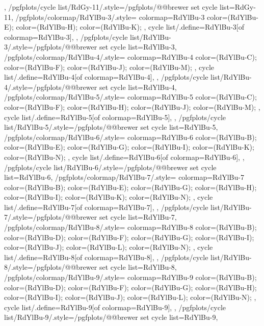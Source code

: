 {{  },
  /pgfplots/cycle list/RdGy-11/.style={/pgfplots/@@brewer set cycle list={RdGy-11}},
  /pgfplots/colormap/RdYlBu-3/.style={
    colormap={RdYlBu-3}{
      color=(RdYlBu-E);
      color=(RdYlBu-H);
      color=(RdYlBu-K);
    },
    cycle list/.define={RdYlBu-3}{[of colormap=RdYlBu-3]},
  },
  /pgfplots/cycle list/RdYlBu-3/.style={/pgfplots/@@brewer set cycle list={RdYlBu-3}},
  /pgfplots/colormap/RdYlBu-4/.style={
    colormap={RdYlBu-4}{
      color=(RdYlBu-C);
      color=(RdYlBu-F);
      color=(RdYlBu-J);
      color=(RdYlBu-M);
    },
    cycle list/.define={RdYlBu-4}{[of colormap=RdYlBu-4]},
  },
  /pgfplots/cycle list/RdYlBu-4/.style={/pgfplots/@@brewer set cycle list={RdYlBu-4}},
  /pgfplots/colormap/RdYlBu-5/.style={
    colormap={RdYlBu-5}{
      color=(RdYlBu-C);
      color=(RdYlBu-F);
      color=(RdYlBu-H);
      color=(RdYlBu-J);
      color=(RdYlBu-M);
    },
    cycle list/.define={RdYlBu-5}{[of colormap=RdYlBu-5]},
  },
  /pgfplots/cycle list/RdYlBu-5/.style={/pgfplots/@@brewer set cycle list={RdYlBu-5}},
  /pgfplots/colormap/RdYlBu-6/.style={
    colormap={RdYlBu-6}{
      color=(RdYlBu-B);
      color=(RdYlBu-E);
      color=(RdYlBu-G);
      color=(RdYlBu-I);
      color=(RdYlBu-K);
      color=(RdYlBu-N);
    },
    cycle list/.define={RdYlBu-6}{[of colormap=RdYlBu-6]},
  },
  /pgfplots/cycle list/RdYlBu-6/.style={/pgfplots/@@brewer set cycle list={RdYlBu-6}},
  /pgfplots/colormap/RdYlBu-7/.style={
    colormap={RdYlBu-7}{
      color=(RdYlBu-B);
      color=(RdYlBu-E);
      color=(RdYlBu-G);
      color=(RdYlBu-H);
      color=(RdYlBu-I);
      color=(RdYlBu-K);
      color=(RdYlBu-N);
    },
    cycle list/.define={RdYlBu-7}{[of colormap=RdYlBu-7]},
  },
  /pgfplots/cycle list/RdYlBu-7/.style={/pgfplots/@@brewer set cycle list={RdYlBu-7}},
  /pgfplots/colormap/RdYlBu-8/.style={
    colormap={RdYlBu-8}{
      color=(RdYlBu-B);
      color=(RdYlBu-D);
      color=(RdYlBu-F);
      color=(RdYlBu-G);
      color=(RdYlBu-I);
      color=(RdYlBu-J);
      color=(RdYlBu-L);
      color=(RdYlBu-N);
    },
    cycle list/.define={RdYlBu-8}{[of colormap=RdYlBu-8]},
  },
  /pgfplots/cycle list/RdYlBu-8/.style={/pgfplots/@@brewer set cycle list={RdYlBu-8}},
  /pgfplots/colormap/RdYlBu-9/.style={
    colormap={RdYlBu-9}{
      color=(RdYlBu-B);
      color=(RdYlBu-D);
      color=(RdYlBu-F);
      color=(RdYlBu-G);
      color=(RdYlBu-H);
      color=(RdYlBu-I);
      color=(RdYlBu-J);
      color=(RdYlBu-L);
      color=(RdYlBu-N);
    },
    cycle list/.define={RdYlBu-9}{[of colormap=RdYlBu-9]},
  },
  /pgfplots/cycle list/RdYlBu-9/.style={/pgfplots/@@brewer set cycle list={RdYlBu-9}},
}

